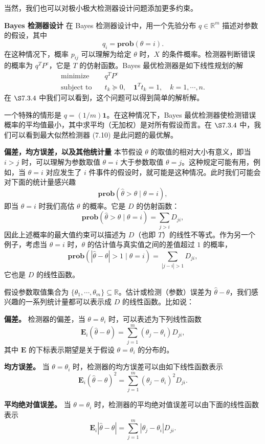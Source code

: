 \documentclass[UTF8,12pt,a4paper,fontset=fandol]{ctexart}
\begin{document}
当然，我们也可以对极小极大检测器设计问题添加更多约束。

\noindent\textbf{Bayes 检测器设计}\quad
在 Bayes 检测器设计中，用一个先验分布 $q\in\mathbb{R}^m$ 描述对参数的假设，其中
\[
q_i=\mathbf{prob}(\theta=i).
\]
在这种情况下，概率 $p_{ij}$ 可以理解为给定 $\theta$ 时，$X$ 的条件概率。检测器判断错误的概率为 $q^TP^e$，它是 $T$ 的仿射函数。Bayes 最优检测器是如下线性规划的解
\[
\begin{aligned}
\text{minimize}\quad & q^TP^e\\
\text{subject to}\quad & t_k\succeq 0,\quad \mathbf{1}^Tt_k=1,\quad k=1,\cdots,n.
\end{aligned}
\]
在 $\S 7.3.4$ 中我们可以看到，这个问题可以得到简单的解析解。

一个特殊的情形是 $q=(1/m)\mathbf{1}$。在这种情况下，Bayes 最优检测器使检测错误概率的平均值最小，其中求平均（无加权）是对所有假设而言。在 $\S 7.3.4$ 中，我们可以看到最大似然检测器 (7.10) 是此问题的最优解。

\noindent\textbf{偏差，均方误差，以及其他统计量}\quad
本节假设 $\theta$ 的取值的相对大小有意义，即当 $i>j$ 时，可以理解为参数取值 $\theta=i$ 大于参数取值 $\theta=j$。这种规定可能有用，例如，当 $\theta=i$ 对应发生了 $i$ 件事件的假设时，就可能是这种情况。此时我们可能会对下面的统计量感兴趣
\[
\mathbf{prob}(\hat{\theta}>\theta\mid \theta=i),
\]
即当 $\theta=i$ 时我们高估 $\theta$ 的概率。它是 $D$ 的仿射函数：
\[
\mathbf{prob}(\hat{\theta}>\theta\mid \theta=i)=\sum_{j>i}D_{ji},
\]
因此上述概率的最大值约束可以描述为 $D$（也即 $T$）的线性不等式。作为另一个例子，考虑当 $\theta=i$ 时，$\theta$ 的估计值与真实值之间的差值超过 $1$ 的概率，
\[
\mathbf{prob}(|\hat{\theta}-\theta|>1\mid \theta=i)=\sum_{|j-i|>1}D_{ji},
\]
它也是 $D$ 的线性函数。

假设参数取值集合为 $\{\theta_1,\cdots,\theta_m\}\subseteq\mathbb{R}$。估计或检测（参数）误差为 $\hat{\theta}-\theta$，我们感兴趣的一系列统计量都可以表示成 $D$ 的线性函数。比如说：

\noindent\textbf{偏差。}\quad
检测器的偏差，当 $\theta=\theta_i$ 时，可以表述为下列线性函数
\[
\mathbf{E}_i(\hat{\theta}-\theta)=\sum_{j=1}^m(\theta_j-\theta_i)D_{ji},
\]
其中 $\mathbf{E}$ 的下标表示期望是关于假设 $\theta=\theta_i$ 的分布的。

\noindent\textbf{均方误差。}\quad
当 $\theta=\theta_i$ 时，检测器的均方误差可以由如下线性函数表示
\[
\mathbf{E}_i(\hat{\theta}-\theta)^2=\sum_{j=1}^m(\theta_j-\theta_i)^2D_{ji}.
\]

\noindent\textbf{平均绝对值误差。}\quad
当 $\theta=\theta_i$ 时，检测器的平均绝对值误差可以由下面的线性函数表示
\[
\mathbf{E}_i|\hat{\theta}-\theta|=\sum_{j=1}^m|\theta_j-\theta_i|D_{ji}.
\]
\end{document}
